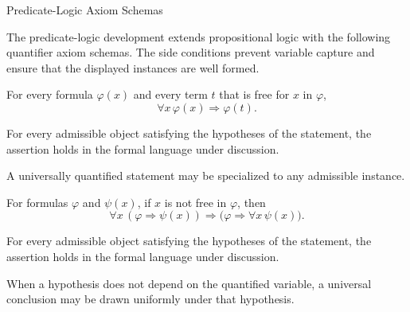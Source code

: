 \begin{topicbox}{Predicate-Logic Axiom Schemas}
\begin{exposition}
The predicate-logic development extends propositional logic with the following
quantifier axiom schemas. The side conditions prevent variable capture and
ensure that the displayed instances are well formed.
\end{exposition}
\end{topicbox}

\begin{axiombox}{}
\begin{axiom}
\label{ax:predicate-logic-universal-instantiation}
For every formula $\varphi(x)$ and every term $t$ that is free for $x$ in
$\varphi$,
\[
\forall x\,\varphi(x) \Longrightarrow \varphi(t).
\]
\end{axiom}
\end{axiombox}
\begin{remark*}
For every admissible object satisfying the hypotheses of the statement, the
assertion holds in the formal language under discussion.
\end{remark*}




\begin{remark*}[Interpretation]
A universally quantified statement may be specialized to any admissible
instance.
\end{remark*}

\NoLocalDependencies

\begin{axiombox}{}
\begin{axiom}
\label{ax:predicate-logic-quantifier-distribution}
For formulas $\varphi$ and $\psi(x)$, if $x$ is not free in $\varphi$, then
\[
\forall x\,(\varphi \Longrightarrow \psi(x))
\Longrightarrow
\bigl(\varphi \Longrightarrow \forall x\,\psi(x)\bigr).
\]
\end{axiom}
\end{axiombox}
\begin{remark*}
For every admissible object satisfying the hypotheses of the statement, the
assertion holds in the formal language under discussion.
\end{remark*}


\begin{remark*}[Interpretation]
When a hypothesis does not depend on the quantified variable, a universal
conclusion may be drawn uniformly under that hypothesis.
\end{remark*}

\NoLocalDependencies

